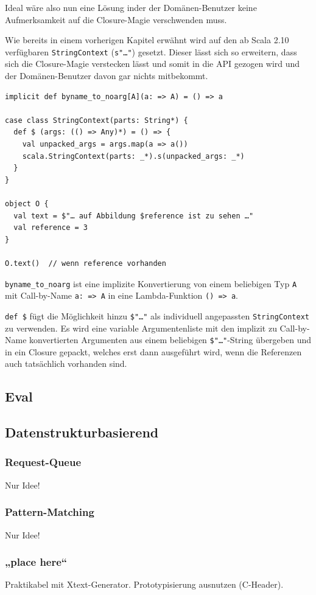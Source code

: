 Ideal wäre also nun eine Lösung inder der Domänen-Benutzer keine
Aufmerksamkeit auf die Closure-Magie verschwenden muss.

Wie bereits in einem vorherigen Kapitel %
erwähnt wird auf den ab Scala 2.10 verfügbaren
\lstinline|StringContext| (\lstinline|s"…"|) gesetzt.
Dieser lässt sich so erweitern, dass
sich die Closure-Magie verstecken lässt und somit in die API
gezogen wird und der Domänen-Benutzer davon gar nichts mitbekommt.

\begin{lstlisting}
implicit def byname_to_noarg[A](a: => A) = () => a

case class StringContext(parts: String*) {
  def $ (args: (() => Any)*) = () => {
    val unpacked_args = args.map(a => a())
    scala.StringContext(parts: _*).s(unpacked_args: _*)
  }
}

object O {
  val text = $"… auf Abbildung $reference ist zu sehen …"
  val reference = 3
}

O.text()  // wenn reference vorhanden
\end{lstlisting}

\lstinline|byname_to_noarg| ist eine implizite Konvertierung von einem
beliebigen Typ \lstinline|A| mit Call-by-Name
\lstinline|a: => A| in eine Lambda-Funktion \lstinline|() => a|.

\lstinline|def $| fügt die Möglichkeit hinzu \lstinline|$"…"| als individuell angepassten \lstinline|StringContext| zu verwenden. Es wird eine variable 
Argumentenliste mit den implizit zu Call-by-Name konvertierten Argumenten
aus einem beliebigen \lstinline|$"…"|-String übergeben und in ein Closure gepackt,
welches erst dann ausgeführt wird, wenn die Referenzen auch tatsächlich
vorhanden sind.



\subsection{Eval}

\subsection{Datenstrukturbasierend}

\subsubsection{Request-Queue}

Nur Idee!

\subsubsection{Pattern-Matching}

Nur Idee!

\subsubsection{„place here“}

Praktikabel mit Xtext-Generator. Prototypisierung ausnutzen (C-Header).
